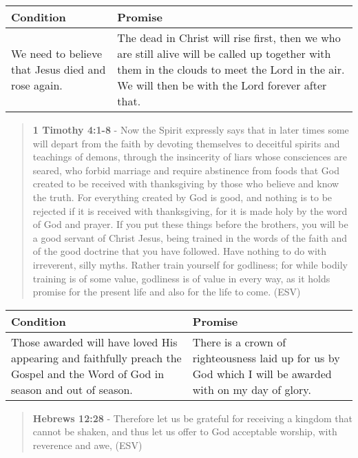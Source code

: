 \documentclass[11pt]{article}
\begin{document}
\begin{center}
\begin{tabular}{ll}
Condition & Promise\\[0pt]
\hline
We need to believe that Jesus died and rose again. & The dead in Christ will rise first, then we who are still alive will be called up together with them in the clouds to meet the Lord in the air. We will then be with the Lord forever after that.\\[0pt]
\end{tabular}
\end{center}

\begin{quote}
\textbf{1 Timothy 4:1-8} - Now the Spirit expressly says that in later times some will depart from the faith by devoting themselves to deceitful spirits and teachings of demons, through the insincerity of liars whose consciences are seared, who forbid marriage and require abstinence from foods that God created to be received with thanksgiving by those who believe and know the truth. For everything created by God is good, and nothing is to be rejected if it is received with thanksgiving, for it is made holy by the word of God and prayer. If you put these things before the brothers, you will be a good servant of Christ Jesus, being trained in the words of the faith and of the good doctrine that you have followed. Have nothing to do with irreverent, silly myths. Rather train yourself for godliness; for while bodily training is of some value, godliness is of value in every way, as it holds promise for the present life and also for the life to come. (ESV)
\end{quote}

\begin{center}
\begin{tabular}{ll}
Condition & Promise\\[0pt]
\hline
Those awarded will have loved His appearing and faithfully preach the Gospel and the Word of God in season and out of season. & There is a crown of righteousness laid up for us by God which I will be awarded with on my day of glory.\\[0pt]
\end{tabular}
\end{center}

\begin{quote}
\textbf{Hebrews 12:28} - Therefore let us be grateful for receiving a kingdom that cannot be shaken, and thus let us offer to God acceptable worship, with reverence and awe, (ESV)
\end{quote}
\end{document}
